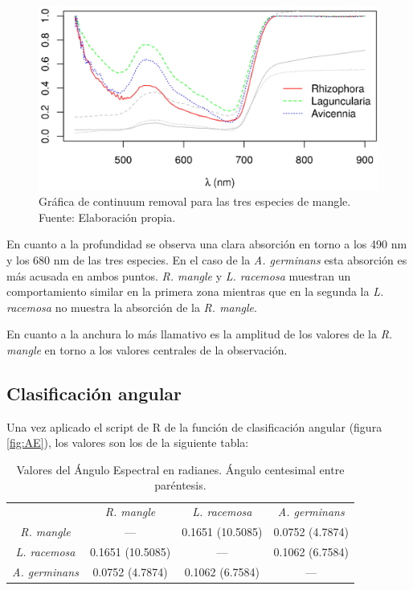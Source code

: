 \begin{figure}
	\centering
	\includegraphics[width=0.8\linewidth]{./Imagenes/ContinuumR2.eps}
	\caption[Gráfica de Continuum Removal]{Gráfica de continuum removal para las tres especies de mangle. Fuente: Elaboración propia.}
	\label{fig:GraficaCR}
\end{figure}

En cuanto a la profundidad se observa una clara absorción en torno a los 490 nm y los 680 nm de las tres especies. En el caso de la \textit{A. germinans} esta absorción es más acusada en ambos puntos. \textit{R. mangle} y \textit{L. racemosa} muestran un comportamiento similar en la primera zona mientras que en la segunda la \textit{L. racemosa} no muestra la absorción de la \textit{R. mangle}.\Sep

En cuanto a la anchura lo más llamativo es la amplitud de los valores de la \textit{R. mangle} en torno a los valores centrales de la observación.

\subsection{Clasificación angular}
Una vez aplicado el script de R de la función de clasificación angular (figura \ref{fig:AE}), los valores son los de la siguiente tabla:

\begin{table}[ht]
	\centering
	\caption[Valores de Ángulo Espectral]{Valores del Ángulo Espectral en radianes. Ángulo centesimal entre paréntesis.}
	\begin{tabular}{@{}cccc@{}}
	\toprule[0.4mm]
	& \textit{R. mangle} & \textit{L. racemosa} & \textit{A. germinans} \\
	\textit{R. mangle} & --- & 0.1651 (10.5085) & 0.0752 (4.7874) \\
	\textit{L. racemosa} & 0.1651 (10.5085) & --- & 0.1062 (6.7584) \\
	\textit{A. germinans} & 0.0752 (4.7874) & 0.1062 (6.7584) & --- \\
	\bottomrule[0.4mm]
	\end{tabular}
\end{table}

